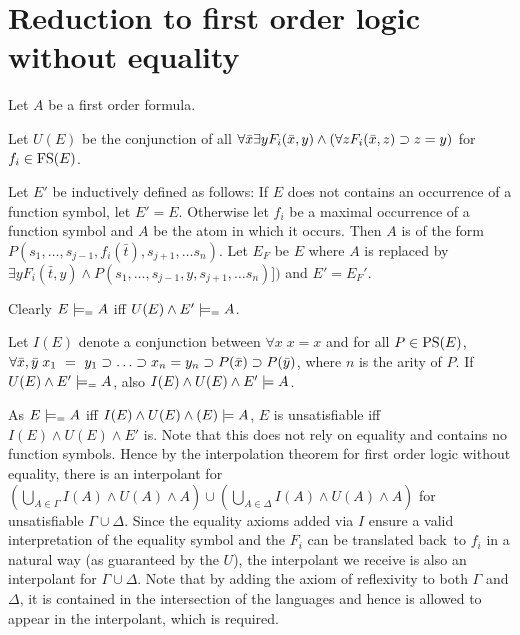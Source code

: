 \section{Reduction to first order logic without equality}


Let $A$ be a first order formula.

Let $U(E)$ be the conjunction of all $\forall \bar x \exists y F_i(\bar x, y) \land (\forall z F_i(\bar x, z) \supset z = y)$ for $f_i \in \mathrm{FS}(E)$.

Let $E'$ be inductively defined as follows: If $E$ does not contains an occurrence of a function symbol, let $E' = E$.
Otherwise let $f_i$ be a maximal occurrence of a function symbol and $A$ be the atom in which it occurs. Then $A$ is of the form $P(s_1, \ldots, s_{j-1}, f_i(\bar t), s_{j+1}, \ldots s_n)$.
Let $E_F$ be $E$ where $A$ is replaced by $\exists y F_i(\bar t, y) \land P(s_1, \ldots, s_{j-1}, y, s_{j+1}, \ldots s_n)])$ and $E' = E_F'$.

Clearly $E \models_= A$ iff $U(E) \land  E' \models_= A$.

Let $I(E)$ denote a conjunction between $\forall x \; x=x$ and for all $P \in\mathrm{PS}(E)$, $\forall \bar x, \bar y\; x_1~=~y_1 \supset \ldots \supset x_n = y_n \supset P(\bar x) \supset P(\bar y)$, where $n$ is the arity of $P$.
If $U(E) \land E' \models_= A$,
also $I(E) \land U(E) \land E' \models A$. 


As $E \models_= A$ iff $I(E) \land U(E) \land (E) \models A$, $E$ is unsatisfiable iff $I(E) \land U(E) \land E'$ is.
Note that this does not rely on equality and contains no function symbols. Hence by the interpolation theorem for first order logic without equality, there is an interpolant for $\left(\bigcup_{A\in \Gamma} I(A) \land U(A) \land A\right) \cup \left(\bigcup_{A\in \Delta} I(A) \land U(A) \land A\right) $ for unsatisfiable $\Gamma \cup \Delta$.
Since the equality axioms added via $I$ ensure a valid interpretation of the equality symbol and the $F_i$ can be translated back\ to $f_i$ in a natural way (as guaranteed by the $U$), the interpolant we receive is also an interpolant for $\Gamma \cup \Delta$.
Note that by adding the axiom of reflexivity to both $\Gamma$ and $\Delta$, it is contained in the intersection of the languages and hence is allowed to appear in the interpolant, which is required. 


